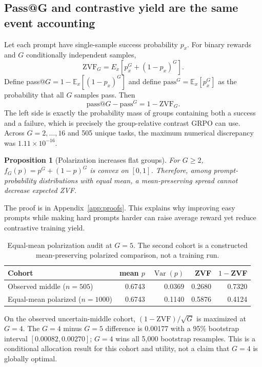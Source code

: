 \documentclass{article}
\newtheorem{proposition}{Proposition}
\newcommand{\E}{\mathbb{E}}
\begin{document}
\subsection{Pass@G and contrastive yield are the same event accounting}

Let each prompt have single-sample success probability $p_x$.  For binary
rewards and $G$ conditionally independent samples,
\begin{equation}
  \mathrm{ZVF}_G=E_x[p_x^G+(1-p_x)^G].
  \label{eq:zvf}
\end{equation}
Define pass@$G=1-\E_x[(1-p_x)^G]$ and define
$\mathrm{pass}^{G}=\E_x[p_x^G]$ as the probability that all $G$ samples pass.
Then
\begin{equation}
  \mathrm{pass@}G-\mathrm{pass}^{G}=1-\mathrm{ZVF}_G.
  \label{eq:duality}
\end{equation}
The left side is exactly the probability mass of groups containing both a
success and a failure, which is precisely the group-relative contrast GRPO
can use.  Across $G=2,\ldots,16$ and 505 unique tasks, the maximum numerical
discrepancy was $1.11\times10^{-16}$.

\begin{proposition}[Polarization increases flat groups]
For $G\geq2$, $f_G(p)=p^G+(1-p)^G$ is convex on $[0,1]$.  Therefore, among
prompt-probability distributions with equal mean, a mean-preserving spread
cannot decrease expected ZVF.
\end{proposition}
The proof is in Appendix~\ref{app:proofs}.  This explains why improving easy
prompts while making hard prompts harder can raise average reward yet reduce
contrastive training yield.

\begin{table}[t]
\centering
\caption{Equal-mean polarization audit at $G=5$.  The second cohort is a
constructed mean-preserving polarized comparison, not a training run.}
\label{tab:polarization}
\small
\begin{tabular}{@{}lrrrr@{}}
\toprule
Cohort & mean $p$ & $\operatorname{Var}(p)$ & ZVF & $1-$ZVF \\
\midrule
Observed middle ($n=505$) & 0.6743 & 0.0369 & 0.2680 & 0.7320 \\
Equal-mean polarized ($n=1000$) & 0.6743 & 0.1140 & 0.5876 & 0.4124 \\
\bottomrule
\end{tabular}
\end{table}

On the observed uncertain-middle cohort, $(1-\mathrm{ZVF})/\sqrt{G}$ is
maximized at $G=4$.  The $G=4$ minus $G=5$ difference is 0.00177 with a
95\% bootstrap interval $[0.00082,0.00270]$; $G=4$ wins all 5,000 bootstrap
resamples.  This is a conditional allocation result for this cohort and
utility, not a claim that $G=4$ is globally optimal.
\end{document}
